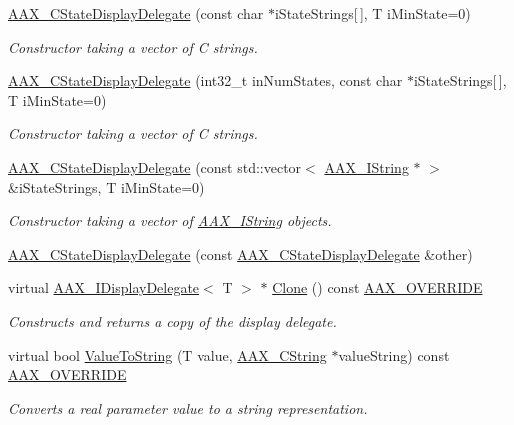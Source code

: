 \begin{DoxyCompactItemize}
\item 
\hyperlink{a00039_a307685fc5172fec5ccfba138f9f4c8ec}{A\+A\+X\+\_\+\+C\+State\+Display\+Delegate} (const char $\ast$i\+State\+Strings\mbox{[}$\,$\mbox{]}, T i\+Min\+State=0)
\begin{DoxyCompactList}\small\item\em Constructor taking a vector of C strings. \end{DoxyCompactList}\item 
\hyperlink{a00039_ae9b9b548d196af94bc7392208da8adfe}{A\+A\+X\+\_\+\+C\+State\+Display\+Delegate} (int32\+\_\+t in\+Num\+States, const char $\ast$i\+State\+Strings\mbox{[}$\,$\mbox{]}, T i\+Min\+State=0)
\begin{DoxyCompactList}\small\item\em Constructor taking a vector of C strings. \end{DoxyCompactList}\item 
\hyperlink{a00039_a9c5b254c68a200198a599026a76e1945}{A\+A\+X\+\_\+\+C\+State\+Display\+Delegate} (const std\+::vector$<$ \hyperlink{a00113}{A\+A\+X\+\_\+\+I\+String} $\ast$ $>$ \&i\+State\+Strings, T i\+Min\+State=0)
\begin{DoxyCompactList}\small\item\em Constructor taking a vector of \hyperlink{a00113}{A\+A\+X\+\_\+\+I\+String} objects. \end{DoxyCompactList}\item 
\hyperlink{a00039_af6651ca6959ea8963c91f89390ff9e35}{A\+A\+X\+\_\+\+C\+State\+Display\+Delegate} (const \hyperlink{a00039}{A\+A\+X\+\_\+\+C\+State\+Display\+Delegate} \&other)
\item 
virtual \hyperlink{a00092}{A\+A\+X\+\_\+\+I\+Display\+Delegate}$<$ T $>$ $\ast$ \hyperlink{a00039_ad6e328d8784aaccc960da70f51f040a3}{Clone} () const \hyperlink{a00149_ac2f24a5172689ae684344abdcce55463}{A\+A\+X\+\_\+\+O\+V\+E\+R\+R\+I\+D\+E}
\begin{DoxyCompactList}\small\item\em Constructs and returns a copy of the display delegate. \end{DoxyCompactList}\item 
virtual bool \hyperlink{a00039_aa8c3a9028d0fcf4bb2a95390de8049fa}{Value\+To\+String} (T value, \hyperlink{a00042}{A\+A\+X\+\_\+\+C\+String} $\ast$value\+String) const \hyperlink{a00149_ac2f24a5172689ae684344abdcce55463}{A\+A\+X\+\_\+\+O\+V\+E\+R\+R\+I\+D\+E}
\begin{DoxyCompactList}\small\item\em Converts a real parameter value to a string representation. \end{DoxyCompactList}\item 

\end{DoxyCompactItemize}
